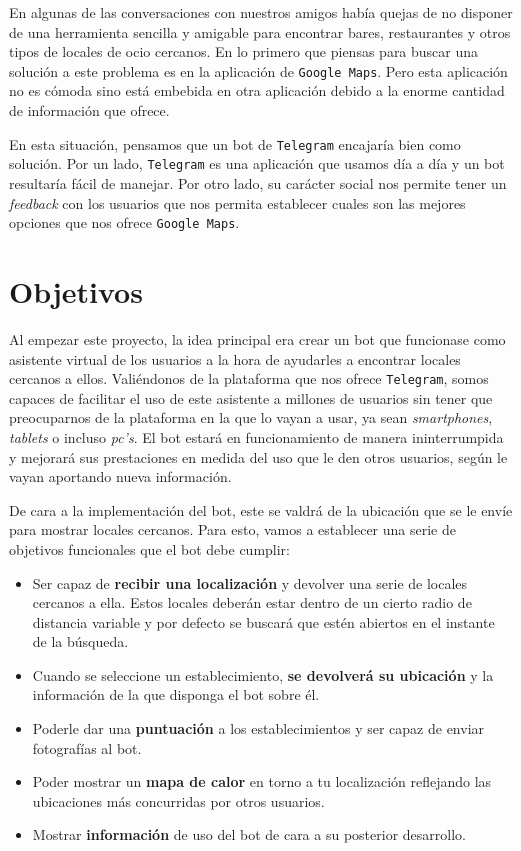 \documentclass[oneside]{memoir}
\begin{document}
En algunas de las conversaciones con nuestros amigos había quejas de no disponer de una herramienta sencilla y amigable para encontrar bares, restaurantes y otros tipos de locales de ocio cercanos. En lo primero que piensas para buscar una solución a este problema es en la aplicación de \texttt{Google Maps}. Pero esta aplicación no es cómoda sino está embebida en otra aplicación debido a la enorme cantidad de información que ofrece.

En esta situación, pensamos que un bot de \texttt{Telegram} encajaría bien como solución. Por un lado, \texttt{Telegram} es una aplicación que usamos día a día y un bot resultaría fácil de manejar. Por otro lado, su carácter social nos permite tener un \textit{feedback} con los usuarios que nos permita establecer cuales son las mejores opciones que nos ofrece \texttt{Google Maps}.

\section{Objetivos}
Al empezar este proyecto, la idea principal era crear un bot que funcionase como asistente virtual de los usuarios a la hora de ayudarles a encontrar locales cercanos a ellos. Valiéndonos de la plataforma que nos ofrece \texttt{Telegram}, somos capaces de facilitar el uso de este asistente a millones de usuarios sin tener que preocuparnos de la plataforma en la que lo vayan a usar, ya sean \textit{smartphones}, \textit{tablets} o incluso \textit{pc's}. El bot estará en funcionamiento de manera ininterrumpida y mejorará sus prestaciones en medida del uso que le den otros usuarios, según le vayan aportando nueva información.

De cara a la implementación del bot, este se valdrá de la ubicación que se le envíe para mostrar locales cercanos. Para esto, vamos a establecer una serie de objetivos funcionales que el bot debe cumplir:

\begin{itemize}
  \item Ser capaz de \textbf{recibir una localización} y devolver una serie de locales cercanos a ella. Estos locales deberán estar dentro de un cierto radio de distancia variable y por defecto se buscará que estén abiertos en el instante de la búsqueda.
  \item Cuando se seleccione un establecimiento, \textbf{se devolverá su ubicación} y la información de la que disponga el bot sobre él.
  \item Poderle dar una \textbf{puntuación} a los establecimientos y ser capaz de enviar fotografías al bot.
  \item Poder mostrar un \textbf{mapa de calor} en torno a tu localización reflejando las ubicaciones más concurridas por otros usuarios.
  \item Mostrar \textbf{información} de uso del bot de cara a su posterior desarrollo.
\end{itemize}
\end{document}
